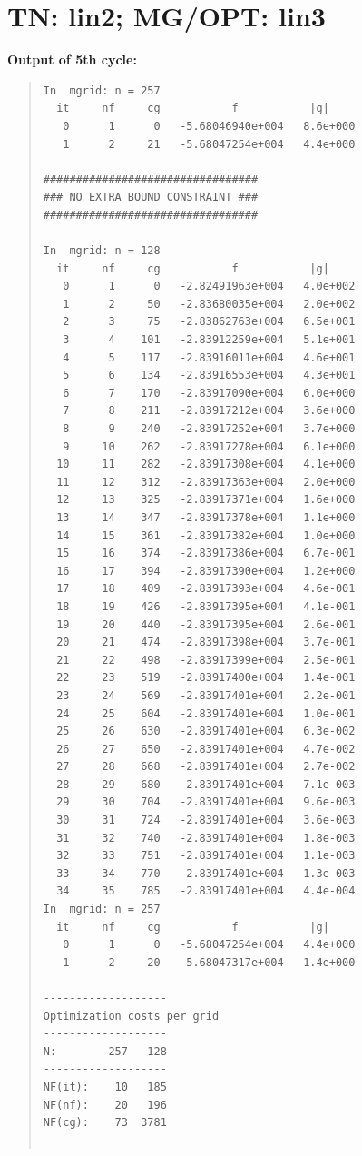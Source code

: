 \documentclass[10pt]{article}
\begin{document}
\section{TN: lin2; MG/OPT: lin3}
\bf{Output of 5th cycle:}
\begin{quote}
\begin{verbatim}
In  mgrid: n = 257
  it     nf     cg           f           |g|
   0      1      0   -5.68046940e+004   8.6e+000
   1      2     21   -5.68047254e+004   4.4e+000
 
#################################
### NO EXTRA BOUND CONSTRAINT ###
#################################
 
In  mgrid: n = 128
  it     nf     cg           f           |g|
   0      1      0   -2.82491963e+004   4.0e+002
   1      2     50   -2.83680035e+004   2.0e+002
   2      3     75   -2.83862763e+004   6.5e+001
   3      4    101   -2.83912259e+004   5.1e+001
   4      5    117   -2.83916011e+004   4.6e+001
   5      6    134   -2.83916553e+004   4.3e+001
   6      7    170   -2.83917090e+004   6.0e+000
   7      8    211   -2.83917212e+004   3.6e+000
   8      9    240   -2.83917252e+004   3.7e+000
   9     10    262   -2.83917278e+004   6.1e+000
  10     11    282   -2.83917308e+004   4.1e+000
  11     12    312   -2.83917363e+004   2.0e+000
  12     13    325   -2.83917371e+004   1.6e+000
  13     14    347   -2.83917378e+004   1.1e+000
  14     15    361   -2.83917382e+004   1.0e+000
  15     16    374   -2.83917386e+004   6.7e-001
  16     17    394   -2.83917390e+004   1.2e+000
  17     18    409   -2.83917393e+004   4.6e-001
  18     19    426   -2.83917395e+004   4.1e-001
  19     20    440   -2.83917395e+004   2.6e-001
  20     21    474   -2.83917398e+004   3.7e-001
  21     22    498   -2.83917399e+004   2.5e-001
  22     23    519   -2.83917400e+004   1.4e-001
  23     24    569   -2.83917401e+004   2.2e-001
  24     25    604   -2.83917401e+004   1.0e-001
  25     26    630   -2.83917401e+004   6.3e-002
  26     27    650   -2.83917401e+004   4.7e-002
  27     28    668   -2.83917401e+004   2.7e-002
  28     29    680   -2.83917401e+004   7.1e-003
  29     30    704   -2.83917401e+004   9.6e-003
  30     31    724   -2.83917401e+004   3.6e-003
  31     32    740   -2.83917401e+004   1.8e-003
  32     33    751   -2.83917401e+004   1.1e-003
  33     34    770   -2.83917401e+004   1.3e-003
  34     35    785   -2.83917401e+004   4.4e-004
In  mgrid: n = 257
  it     nf     cg           f           |g|
   0      1      0   -5.68047254e+004   4.4e+000
   1      2     20   -5.68047317e+004   1.4e+000

-------------------
Optimization costs per grid
-------------------
N:        257   128
-------------------
NF(it):    10   185
NF(nf):    20   196
NF(cg):    73  3781
-------------------
\end{verbatim}
\end{quote}
\end{document}
